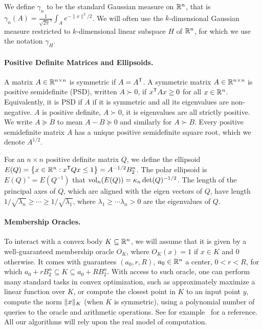 We define $\gamma_n$ to be the standard Gaussian measure on ${\mathbb{R}}^n$, that is
$\gamma_n(A) = \frac{1}{\sqrt{2\pi}^n} \int_A e^{-\|x\|^2/2}$. We will often use
the $k$-dimensional Gaussian measure restricted to $k$-dimensional linear
subspace $H$ of ${\mathbb{R}}^n$, for which we use the notation $\gamma_H$.

\paragraph{\bf Positive Definite Matrices and Ellipsoids.} A matrix $A \in {\mathbb{R}}^{n
\times n}$ is symmetric if $A = A^\mathsf T$. A symmetric matrix $A \in {\mathbb{R}}^{n \times
n}$ is positive semidefinite (PSD), written $A \succ 0$, if $x^\mathsf T A x \geq 0$
for all $x \in {\mathbb{R}}^n$. Equivalently, it is PSD if $A$ if it is symmetric and all
its eigenvalues are non-negative. $A$ is positive definite, $A \succ 0$, it is
eigenvalues are all strictly positive. We write $A \succeq B$ to mean $A-B
\succeq 0$ and similarly for $A \succ B$. Every positive semidefinite matrix $A$
has a unique positive semidefinite square root, which we denote $A^{1/2}$. 

For an $n \times n$ positive definite matrix $Q$, we define the ellipsoid $E(Q)
= \left\{ x \in {\mathbb{R}}^n: x^\mathsf T Q x \leq 1 \right\} = A^{-1/2} B_2^n$. The polar ellipsoid is
$E(Q)^\circ = E(Q^{-1})$ that $\operatorname{vol}_n(E(Q)) = \kappa_n \det(Q)^{-1/2}$. The
length of the principal axes of $Q$, which are aligned with the eigen vectors of
$Q$, have length $1/\sqrt{\lambda_n} \geq \cdots \geq 1/\sqrt{\lambda_1}$, where
$\lambda_1 \geq \cdots \lambda_n > 0$ are the eigenvalues of $Q$.   

\paragraph{\bf Membership Oracles.} To interact with a convex body $K \subseteq
{\mathbb{R}}^n$, we will assume that it is given by a well-guaranteed membership oracle
$O_K$, where $O_K(x) = 1$ if $x \in K$ and $0$ otherwise. It comes with
guarantees $(a_0,r,R)$, $a_0 \in {\mathbb{R}}^n$ a center, $0 < r < R$, for which $a_0 +
rB_2^n \subseteq K \subseteq a_0 + RB_2^n$. With access to such oracle, one can
perform many standard tasks in convex optimization, such as approximately
maximize a linear function over $K$, or compute the closest point in $K$ to an
input point $y$, compute the norm $\lVert x\rVert_K$ (when $K$ is symmetric), using a
polynomial number of queries to the oracle and arithmetic operations. See for
example~\cite{GLS} for a reference. All our algorithms will rely upon the real
model of computation.  

